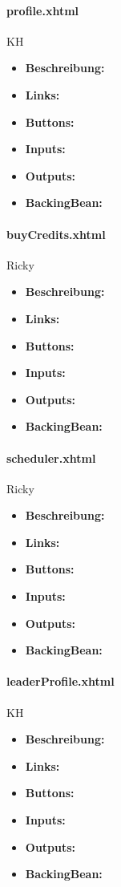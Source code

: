 				\paragraph{profile.xhtml}
					KH\\
					\begin{itemize}
						\item \textbf{Beschreibung:}
						\item \textbf{Links:}
						\item \textbf{Buttons:}
						\item \textbf{Inputs:}
						\item \textbf{Outputs:}
						\item \textbf{BackingBean:}
					\end{itemize}
				
				\paragraph{buyCredits.xhtml}
				Ricky
					\begin{itemize}
						\item \textbf{Beschreibung:}
						\item \textbf{Links:}
						\item \textbf{Buttons:}
						\item \textbf{Inputs:}
						\item \textbf{Outputs:}
						\item \textbf{BackingBean:}
					\end{itemize}
				
				\paragraph{scheduler.xhtml}
				Ricky
					\begin{itemize}
						\item \textbf{Beschreibung:}
						\item \textbf{Links:}
						\item \textbf{Buttons:}
						\item \textbf{Inputs:}
						\item \textbf{Outputs:}
						\item \textbf{BackingBean:}
					\end{itemize}
				
				\paragraph{leaderProfile.xhtml}
					KH\\
					\begin{itemize}
						\item \textbf{Beschreibung:}
						\item \textbf{Links:}
						\item \textbf{Buttons:}
						\item \textbf{Inputs:}
						\item \textbf{Outputs:}
						\item \textbf{BackingBean:}
					\end{itemize}
				
